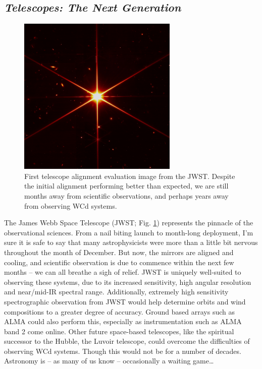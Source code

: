 \subsection{\emph{Telescopes: The Next Generation}}

\begin{figure}
  \centering
  \includegraphics[width=3in]{assets/jwst.jpg}
  \caption[\emph{First telescope alignment evaluation image from the JWST}]{First telescope alignment evaluation image from the JWST. Despite the initial alignment performing better than expected, we are still months away from scientific observations, and perhaps years away from observing WCd systems.}
  \label{fig:jwst}
\end{figure}

The James Webb Space Telescope (JWST; Fig. \ref{fig:jwst}) represents the pinnacle of the observational sciences.
From a nail biting launch to month-long deployment, I'm sure it is safe to say that many astrophysicists were more than a little bit nervous throughout the month of December.
But now, the mirrors are aligned and cooling, and scientific observation is due to commence within the next few months -- we can all breathe a sigh of relief.
JWST is uniquely well-suited to observing these systems, due to its increased sensitivity, high angular resolution and near/mid-IR spectral range.
Additionally, extremely high sensitivity spectrographic observation from JWST would help determine orbits and wind compositions to a greater degree of accuracy.
Ground based arrays such as ALMA could also perform this, especially as instrumentation such as ALMA band 2 come online.
Other future space-based telescopes, like the spiritual successor to the Hubble, the Luvoir telescope, could overcome the difficulties of observing WCd systems.
Though this would not be for a number of decades.
Astronomy is -- as many of us know -- occasionally a waiting game\ldots


